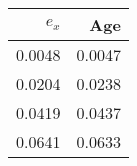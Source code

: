 \begin{tabular}{rr}
  \hline
$e_x$ & Age \\ 
  \hline
0.0048 & 0.0047 \\ 
  0.0204 & 0.0238 \\ 
  0.0419 & 0.0437 \\ 
  0.0641 & 0.0633 \\ 
   \hline
\end{tabular}
